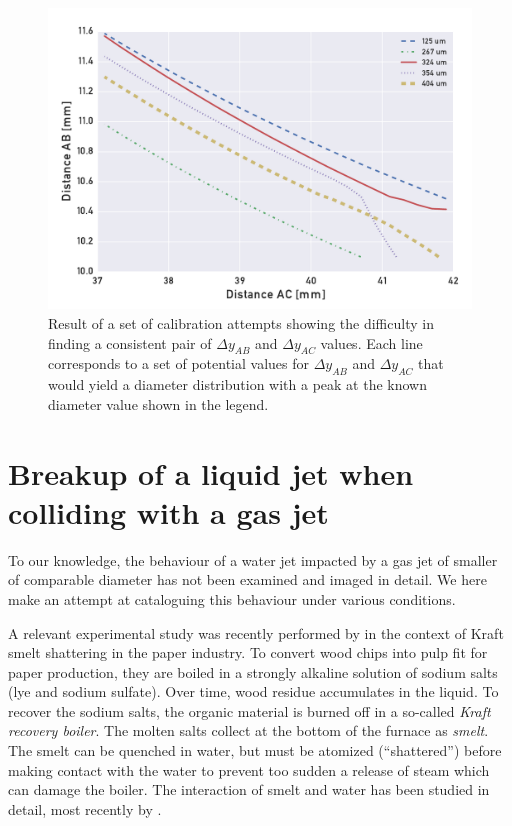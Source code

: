 \documentclass[11.5pt]{book}
\begin{document}
\begin{figure}
    \centering
    \includegraphics[width=\textwidth]{img/pdpa/all-coinc-AB-AC-zerorelations.pdf}
    \caption{Result of a set of calibration attempts showing the difficulty in
            finding a consistent pair of $\Delta y_{AB}$ and $\Delta y_{AC}$
            values. Each line corresponds to a set of potential values for
    $\Delta y_{AB}$ and $\Delta y_{AC}$ that would yield a diameter distribution
    with a peak at the known diameter value shown in the legend.
    \label{fig:pdpa-zerorelations}}
\end{figure}



\chapter{Breakup of a liquid jet when colliding with a gas jet}

To our knowledge, the behaviour of a water jet impacted by a gas jet of smaller of
comparable diameter has not been examined and imaged in detail. We here make an
attempt at cataloguing this behaviour under various conditions.

A relevant experimental study was recently performed by \citet{Taranenko13} in
the context of Kraft smelt shattering in the paper industry. To convert wood
chips into pulp fit for paper production, they are boiled in a strongly alkaline
solution of sodium salts (lye and sodium sulfate).  Over time, wood residue
accumulates in the liquid. To recover the sodium salts, the organic material is
burned off in a so-called \emph{Kraft recovery boiler}.  The molten salts
collect at the bottom of the furnace as \emph{smelt}. The smelt can be quenched
in water, but must be atomized (``shattered'') before making contact with the
water to prevent too sudden a release of steam which can damage the boiler. The
interaction of smelt and water has been studied in detail, most recently by
\citet{Jin13}.
\end{document}
